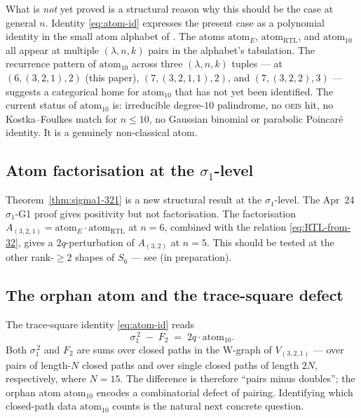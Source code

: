 \documentclass{article}
\theoremstyle{definition}
\begin{document}
What is \emph{not} yet proved is a structural reason why this should be the case
at general $n$. Identity \eqref{eq:atom-id} expresses the present case as a
polynomial identity in the small atom alphabet of
\cite{ClioApr23-atomalphabet}. The atoms $\mathrm{atom}_E$,
$\mathrm{atom}_{\mathrm{RTL}}$, and $\mathrm{atom}_{10}$ all appear at multiple
$(\lambda,n,k)$ pairs in the alphabet's tabulation. The recurrence pattern of
$\mathrm{atom}_{10}$ across three $(\lambda,n,k)$ tuples — at $(6,(3,2,1),2)$
(this paper), $(7,(3,2,1,1),2)$, and $(7,(3,2,2),3)$ — suggests a categorical
home for $\mathrm{atom}_{10}$ that has not yet been identified. The current
status of $\mathrm{atom}_{10}$ is: irreducible degree-$10$ palindrome, no
\textsc{oeis} hit, no Kostka--Foulkes match for $n\leq 10$, no Gaussian binomial
or parabolic Poincaré identity. It is a genuinely non-classical atom.

\subsection*{Atom factorisation at the $\sigma_1$-level}

Theorem~\ref{thm:sigma1-321} is a new structural result at the $\sigma_1$-level.
The Apr~24 $\sigma_1$-G1 proof gives positivity but not factorisation. The
factorisation $A_{(3,2,1)}=\mathrm{atom}_E\cdot\mathrm{atom}_{\mathrm{RTL}}$ at
$n=6$, combined with the relation
\eqref{eq:RTL-from-32}, gives a $2q$-perturbation of $A_{(3,2)}$ at $n=5$. This
should be tested at the other rank-$\geq 2$ shapes of $S_6$ — see
\cite{ClioApr29-branchingdecomp} (in preparation).

\subsection*{The orphan atom and the trace-square defect}

The trace-square identity \eqref{eq:atom-id} reads
\[
\sigma_1^{\,2}\;-\;F_2\;=\;2q\cdot\mathrm{atom}_{10}.
\]
Both $\sigma_1^{\,2}$ and $F_2$ are sums over closed paths in the W-graph of
$V_{(3,2,1)}$ — over pairs of length-$N$ closed paths and over single closed
paths of length $2N$, respectively, where $N=15$. The difference is therefore
``pairs minus doubles''; the orphan atom $\mathrm{atom}_{10}$ encodes a
combinatorial defect of pairing. Identifying which closed-path data
$\mathrm{atom}_{10}$ counts is the natural next concrete question.
\end{document}
